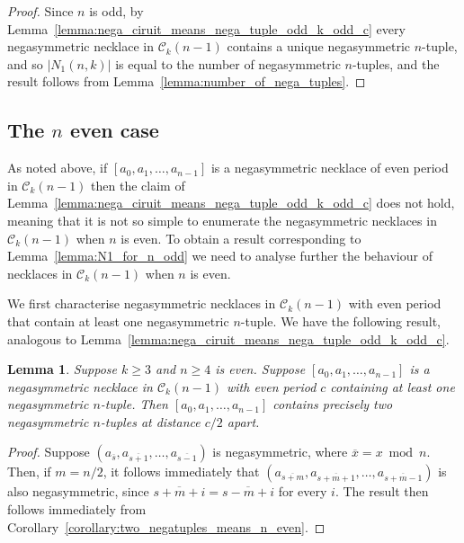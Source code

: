 \documentclass[a4paper,11pt]{article}
\theoremstyle{plain}
\newtheorem{lemma}{Lemma}[section]
\theoremstyle{definition}
\theoremstyle{remark}
\begin{document}
\begin{proof}
Since $n$ is odd, by Lemma~\ref{lemma:nega_ciruit_means_nega_tuple_odd_k_odd_c} every negasymmetric
necklace in $\mathcal{C}_k(n-1)$ contains a unique negasymmetric $n$-tuple, and so $|N_1(n,k)|$ is
equal to the number of negasymmetric $n$-tuples, and the result follows from
Lemma~\ref{lemma:number_of_nega_tuples}.
\end{proof}




\subsection{The \texorpdfstring{$n$}{n} even case}  \label{section:circuit_enumeration_kodd_neven}

As noted above, if $[a_0,a_1,\dots,a_{n-1}]$ is a negasymmetric necklace of even period in
$\mathcal{C}_k(n-1)$ then the claim of Lemma~\ref{lemma:nega_ciruit_means_nega_tuple_odd_k_odd_c}
does not hold, meaning that it is not so simple to enumerate the negasymmetric necklaces in
$\mathcal{C}_k(n-1)$ when $n$ is even. To obtain a result corresponding to
Lemma~\ref{lemma:N1_for_n_odd} we need to analyse further the behaviour of necklaces in
$\mathcal{C}_k(n-1)$ when $n$ is even.

We first characterise negasymmetric necklaces in $\mathcal{C}_k(n-1)$ with even period that contain
at least one negasymmetric $n$-tuple.  We have the following result, analogous to
Lemma~\ref{lemma:nega_ciruit_means_nega_tuple_odd_k_odd_c}.

\begin{lemma}  \label{lemma:nega_ciruit_means_02_nega_tuples_odd_k_even_c}
Suppose $k\geq3$ and $n\geq 4$ is even.  Suppose $[a_0,a_1,\dots,a_{n-1}]$ is a negasymmetric
necklace in $\mathcal{C}_k(n-1)$ with even period $c$ containing at least one negasymmetric
$n$-tuple.  Then $[a_0,a_1,\dots,a_{n-1}]$ contains precisely two negasymmetric $n$-tuples at
distance $c/2$ apart.
\end{lemma}

\begin{proof}
Suppose $(a_{\overline{s}},a_{\overline{s+1}},\dots,a_{\overline{s-1}})$ is negasymmetric, where
$\overline{x}=x\bmod n$. Then, if $m=n/2$, it follows immediately that
$(a_{\overline{s+m}},a_{\overline{s+m+1}},\dots,a_{\overline{s+m-1}})$ is also negasymmetric, since
$\overline{s+m+i}=\overline{s-m+i}$ for every $i$.  The
result then follows immediately from Corollary~\ref{corollary:two_negatuples_means_n_even}.
\end{proof}
\end{document}
